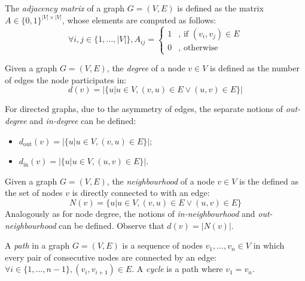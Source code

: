 \begin{definition}
The \emph{adjacency matrix} of a graph $G=(V, E)$ is defined as the matrix $A \in \{0,1\}^{|V| \times |V|}$, whose elements are computed as follows:
\begin{equation}
\forall i,j \in \{1, \dots, |V|\}, A_{ij} = \begin{cases}1 &\text{, if }(v_i, v_j) \in E \\ 0 & \text{, otherwise} \end{cases}
\end{equation}
\end{definition}

\begin{definition}
Given a graph $G=(V, E)$, the \emph{degree} of a node $v \in V$ is defined as the number of edges the node participates in: 
\begin{equation}
d(v) = |\{u|u \in V, (v, u) \in E \vee (u, v) \in E \}|
\end{equation}

For directed graphs, due to the asymmetry of edges, the separate notions of \emph{out-degree} and \emph{in-degree} can be defined:
\begin{itemize}
\item $d_{\text{out}}(v) = |\{u|u \in V, (v, u) \in E \}|$;
\item $d_{\text{in}}(v) = |\{u|u \in V, (u, v) \in E \}|$.
\end{itemize}
\end{definition}

\begin{definition}
Given a graph $G=(V, E)$, the \emph{neighbourhood} of a node $v \in V$ is the defined as the set of nodes $v$ is directly connected to with an edge: \begin{equation}
N(v)=\{u|u\in V, (v,u) \in E \vee (u,v) \in E \}
\end{equation} 
Analogously as for node degree, the notions of \emph{in-neighbourhood} and \emph{out-neighbourhood} can be defined. Observe that $d(v)=|N(v)|$.
\end{definition}

\begin{definition}
A \emph{path} in a graph $G=(V, E)$ is a sequence of nodes $v_1,\dots,v_n \in V$ in which every pair of consecutive nodes are connected by an edge:\\ $\forall i \in \{1,\dots,n-1\},(v_i,v_{i+1})\in E$. A \emph{cycle} is a path where $v_1=v_n$.
\end{definition}

